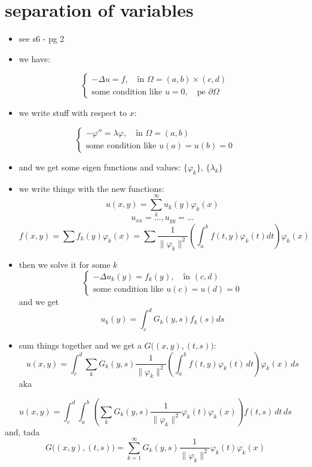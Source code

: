 \documentclass[11pt]{article}
\renewcommand{\phi}{\varphi} \newcommand{\parti}[2]{\frac{\partial #1}{\partial #2}}
\begin{document}
\section*{separation of variables}
\label{sec:orgea0b630}
\begin{itemize}
\item see s6 - pg 2
\item we have:
\end{itemize}
\[
\begin{cases}
-\Delta u = f,\quad \text{în }\Omega = (a, b) \times (c, d)\\
\text{some condition like } u = 0,\quad \text{pe }\partial\Omega
\end{cases}
\]
\begin{itemize}
\item we write stuff with respect to \(x\):
\end{itemize}
\[
\begin{cases}
- \phi'' = \lambda \phi,\quad \text{în }\Omega = (a, b)\\
\text{some condition like } u(a) = u(b) = 0
\end{cases}
\]
\begin{itemize}
\item and we get some eigen functions and values: 
\(\{\phi_k\}\), \(\{\lambda_k\}\)
\item we write things with the new functions:
\[ u(x, y) = \sum^\infty_k u_k(y) \phi_k(x) \]
\[ u_{xx} = ..., u_{yy} = ...\]
\[ f(x, y) = \sum f_k(y) \phi_k(x) = \sum \frac{1}{\| \phi_k\|^2} \left( \int_a^b f(t, y) \phi_k(t) dt \right) \phi_k(x)\]
\end{itemize}
\begin{itemize}
\item then we solve it for some \(k\)
\[
\begin{cases}
-\Delta u_k(y) = f_k(y),\quad \text{în }(c, d)\\
\text{some condition like } u(c) = u(d) = 0
\end{cases}
\]
and we get
\[ u_k(y) = \int_c^d G_k(y, s) f_k(s) ds \]
\item sum things together and we get a \(G \big((x, y), (t, s)\big)\):
 \[ u(x, y) = \int_c^d \sum_k G_k(y, s) \frac{1}{\| \phi_k\|^2} \left( \int_a^b f(t, y) \phi_k(t) \, dt \right) \phi_k(x)\, ds \]
aka
\end{itemize}
\[ u(x, y) = \int_c^d \int_a^b \left(\sum_k G_k(y, s) \frac{1}{\| \phi_k\|^2}  \phi_k(t) \phi_k(x) \right) f(t, s) \, dt \, ds \]
  and, tada
  \[G \big((x, y), (t, s)\big) = \sum_{k=1}^\infty G_k(y, s) \frac{1}{\| \phi_k\|^2}  \phi_k(t) \phi_k(x) \]
\end{document}
